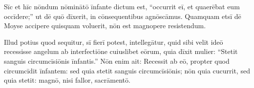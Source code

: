 Sīc et hīc nōndum nōminātō īnfante
dictum est, ``occurrit eī, et quaerēbat eum occīdere;'' ut dē quō dīxerit,
in cōnsequentibus agnōscāmus.  Quamquam etsī dē Moyse accipere quisquam
voluerit, nōn est magnopere resistendum.

Illud potius quod sequitur, sī
fierī potest, intellegātur, quid sibi velit ideō recessisse angelum ab
interfectiōne cuiuslibet eōrum, quia dīxit mulier: ``Stetit sanguis
circumcīsiōnis īnfantis.'' Nōn enim ait: Recessit ab eō, propter quod
circumcīdit īnfantem: sed quia stetit sanguis circumcīsiōnis; nōn quia
cucurrit, sed quia stetit: magnō, nisi fallor, sacrāmentō. 
